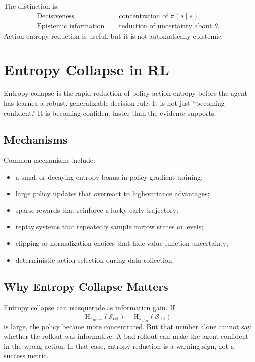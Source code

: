 \documentclass[11pt]{article}
\newcommand{\Sref}{\mathcal{S}_{\mathrm{ref}}}
\newcommand{\Hent}{\mathrm{H}}
\begin{document}
The distinction is:
\begin{align}
  \text{Decisiveness}
  &=
  \text{concentration of }\pi(a \mid s),
  \\
  \text{Epistemic information}
  &=
  \text{reduction of uncertainty about }\theta.
\end{align}
Action entropy reduction is useful, but it is not automatically epistemic.

\section{Entropy Collapse in RL}

Entropy collapse is the rapid reduction of policy action entropy before the
agent has learned a robust, generalizable decision rule. It is not just
``becoming confident.'' It is becoming confident faster than the evidence
supports.

\subsection{Mechanisms}

Common mechanisms include:
\begin{itemize}[leftmargin=*]
  \item a small or decaying entropy bonus in policy-gradient training;
  \item large policy updates that overreact to high-variance advantages;
  \item sparse rewards that reinforce a lucky early trajectory;
  \item replay systems that repeatedly sample narrow states or levels;
  \item clipping or normalization choices that hide value-function uncertainty;
  \item deterministic action selection during data collection.
\end{itemize}

\subsection{Why Entropy Collapse Matters}

Entropy collapse can masquerade as information gain. If
\begin{equation}
  \bar{\Hent}_{\pi_{\mathrm{before}}}(\Sref)
  -
  \bar{\Hent}_{\pi_{\mathrm{after}}}(\Sref)
\end{equation}
is large, the policy became more concentrated. But that number alone cannot say
whether the rollout was informative. A bad rollout can make the agent confident
in the wrong action. In that case, entropy reduction is a warning sign, not a
success metric.
\end{document}
